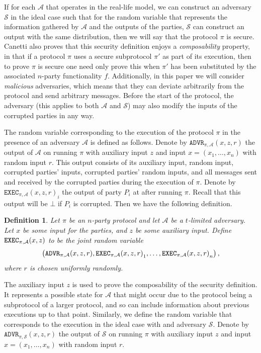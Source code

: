 \documentclass{article}
\newcommand\paper{paper}
\newtheorem{definition}{Definition}
\theoremstyle{remark}
\begin{document}
If for each $\mathcal{A}$ that operates in the real-life model, we can
construct an adversary $\mathcal{S}$ in the ideal case such that for the random
variable that represents the information gathered by $\mathcal{A}$ and the
outputs of the parties, $\mathcal{S}$ can construct an output with the same
distribution, then we will say that the protocol $\pi$ is secure. Canetti also
proves that this security definition enjoys a \textit{composability} property,
in that if a protocol $\pi$ uses a secure subprotocol $\pi'$ as part of its
execution, then to prove $\pi$ is secure one need only prove this when $\pi'$
has been substituted by the associated $n$-party functionality $f$.
Additionally, in this \paper{} we will consider \textit{malicious} adversaries,
which means that they can deviate arbitrarily from the protocol and send
arbitrary messages. Before the start of the protocol, the adversary (this
applies to both $\mathcal{A}$ and $\mathcal{S}$) may also modify the inputs of
the corrupted parties in any way.

The random variable corresponding to the execution of the protocol $\pi$ in the
presence of an adversary $\mathcal{A}$ is defined as follows. Denote by
$\texttt{ADVR}_{\pi, \mathcal{A}}(x, z, r)$ the output of $\mathcal{A}$ on
running $\pi$ with auxiliary input $z$ and input $x = (x_1, \ldots, x_n)$ with
random input $r$. This output consists of its auxiliary input, random input,
corrupted parties' inputs, corrupted parties' random inputs, and all messages
sent and received by the corrupted parties during the execution of $\pi$.
Denote by ${\texttt{EXEC}_{\pi, \mathcal{A}}(x, z, r)}_i$ the output of party
$P_i$ at after running $\pi$. Recall that this output will be $\bot$ if $P_i$
is corrupted. Then we have the following definition.

\begin{definition}
	Let $\pi$ be an $n$-party protocol and let $\mathcal{A}$ be a $t$-limited
	adversary. Let $x$ be some input for the parties, and $z$ be some auxiliary
	input. Define $\textup{\texttt{EXEC}}_{\pi, \mathcal{A}} (x, z)$ to be the joint random variable
	\begin{align*}
		\left(
			\textup{\texttt{ADVR}}_{\pi, \mathcal{A}}(x, z, r),
			{\textup{\texttt{EXEC}}_{\pi, \mathcal{A}}(x, z, r)}_1,
			\ldots,
			{\textup{\texttt{EXEC}}_{\pi, \mathcal{A}}(x, z, r)}_n
		\right),
	\end{align*}
	where $r$ is chosen uniformly randomly.
\end{definition}

The auxiliary input $z$ is used to prove the composability of the security
definition. It represents a possible state for $\mathcal{A}$ that might occur
due to the protocol being a subprotocol of a larger protocol, and so can
include information about previous executions up to that point. Similarly, we
define the random variable that corresponds to the execution in the ideal case
with and adversary $\mathcal{S}$. Denote by $\texttt{ADVR}_{\pi,
\mathcal{S}}(x, z, r)$ the output of $\mathcal{S}$ on running $\pi$ with
auxiliary input $z$ and input $x = (x_1, \ldots, x_n)$ with random input $r$.
\end{document}
